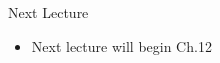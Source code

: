 \documentclass[aspectratio=1610]{beamer}
\begin{document}

%			
%			

\begin{frame}[wide]{Next Lecture}
	\begin{itemize}
		\item Next lecture will begin Ch.12
	\end{itemize}
\end{frame}
\end{document}
